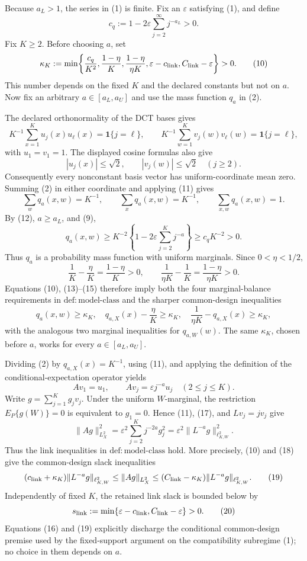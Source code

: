 Because \(a_L>1\), the series in (1) is finite.  Fix an \(\varepsilon\) satisfying (1), and define
\[
c_q:=1-2\varepsilon\sum_{j=2}^{\infty}j^{-a_L}>0.
\tag{9}
\]
Fix \(K\ge2\).  Before choosing \(a\), set
\[
\kappa_K:=\min\!\left\{
\frac{c_q}{K^2},\frac{1-\eta}{K},
\frac{1-\eta}{\eta K},
\varepsilon-c_{\rm link},C_{\rm link}-\varepsilon
\right\}>0.
\tag{10}
\]
This number depends on the fixed \(K\) and the declared constants but not on \(a\).  Now fix an arbitrary \(a\in[a_L,a_U]\) and use the mass function \(q_a\) in (2).

The declared orthonormality of the DCT bases gives
\[
K^{-1}\sum_{x=1}^Ku_j(x)u_\ell(x)=\mathbf 1\{j=\ell\},
\qquad
K^{-1}\sum_{w=1}^Kv_j(w)v_\ell(w)=\mathbf 1\{j=\ell\},
\tag{11}
\]
with \(u_1=v_1=1\).  The displayed cosine formulas also give
\[
|u_j(x)|\le\sqrt2,
\qquad
|v_j(w)|\le\sqrt2
\quad (j\ge2).
\tag{12}
\]
Consequently every nonconstant basis vector has uniform-coordinate mean zero.  Summing (2) in either coordinate and applying (11) gives
\[
\sum_wq_a(x,w)=K^{-1},
\qquad
\sum_xq_a(x,w)=K^{-1},
\qquad
\sum_{x,w}q_a(x,w)=1.
\tag{13}
\]
By (12), \(a\ge a_L\), and (9),
\[
q_a(x,w)
\ge K^{-2}\left\{1-2\varepsilon\sum_{j=2}^Kj^{-a}\right\}
\ge c_qK^{-2}>0.
\tag{14}
\]
Thus \(q_a\) is a probability mass function with uniform marginals.  Since \(0<\eta<1/2\),
\[
\frac1K-\frac{\eta}{K}=\frac{1-\eta}{K}>0,
\qquad
\frac{1}{\eta K}-\frac1K=\frac{1-\eta}{\eta K}>0.
\tag{15}
\]
Equations (10), (13)--(15) therefore imply both the four marginal-balance requirements in \(\mathrm{def:model\mbox{-}class}\) and the sharper common-design inequalities
\[
q_a(x,w)\ge\kappa_K,
\quad
q_{a,X}(x)-\frac\eta K\ge\kappa_K,
\quad
\frac1{\eta K}-q_{a,X}(x)\ge\kappa_K,
\tag{16}
\]
with the analogous two marginal inequalities for \(q_{a,W}(w)\).  The same \(\kappa_K\), chosen before \(a\), works for every \(a\in[a_L,a_U]\).

Dividing (2) by \(q_{a,X}(x)=K^{-1}\), using (11), and applying the definition of the conditional-expectation operator yields
\[
Av_1=u_1,
\qquad
Av_j=\varepsilon j^{-a}u_j
\quad (2\le j\le K).
\tag{17}
\]
Write \(g=\sum_{j=1}^Kg_jv_j\).  Under the uniform \(W\)-marginal, the restriction \(E_P\{g(W)\}=0\) is equivalent to \(g_1=0\).  Hence (11), (17), and \(Lv_j=jv_j\) give
\[
\|Ag\|_{L^2_X}^2
=\varepsilon^2\sum_{j=2}^Kj^{-2a}g_j^2
=\varepsilon^2\|L^{-a}g\|_{\ell^2_{K,W}}^2.
\tag{18}
\]
Thus the link inequalities in \(\mathrm{def:model\mbox{-}class}\) hold.  More precisely, (10) and (18) give the common-design slack inequalities
\[
(c_{\rm link}+\kappa_K)\|L^{-a}g\|_{\ell^2_{K,W}}
\le \|Ag\|_{L^2_X}
\le (C_{\rm link}-\kappa_K)\|L^{-a}g\|_{\ell^2_{K,W}}.
\tag{19}
\]
Independently of fixed \(K\), the retained link slack is bounded below by
\[
s_{\rm link}:=\min\{\varepsilon-c_{\rm link},C_{\rm link}-\varepsilon\}>0.
\tag{20}
\]
Equations (16) and (19) explicitly discharge the conditional common-design premise used by the fixed-support argument on the compatibility subregime (1); no choice in them depends on \(a\).

